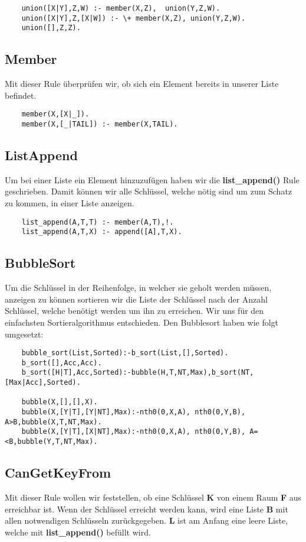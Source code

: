 \begin{verbatim}
    union([X|Y],Z,W) :- member(X,Z),  union(Y,Z,W).
    union([X|Y],Z,[X|W]) :- \+ member(X,Z), union(Y,Z,W).
    union([],Z,Z).
\end{verbatim}

\subsection{Member}
Mit dieser Rule überprüfen wir, ob sich ein Element bereits in 
unserer Liste befindet.

\begin{verbatim}
    member(X,[X|_]).
    member(X,[_|TAIL]) :- member(X,TAIL).
\end{verbatim}

\newpage

\subsection{ListAppend}
Um bei einer Liste ein Element hinzuzufügen haben wir die \textbf{list_append()} Rule geschrieben. Damit können wir alle Schlüssel, welche nötig sind um zum
Schatz zu kommen, in einer Liste anzeigen.

\begin{verbatim}
    list_append(A,T,T) :- member(A,T),!.
    list_append(A,T,X) :- append([A],T,X).
\end{verbatim}

\subsection{BubbleSort}
Um die Schlüssel in der Reihenfolge, in welcher sie geholt werden müssen, anzeigen zu können sortieren wir
die Liste der Schlüssel nach der Anzahl Schlüssel, welche benötigt werden um ihn zu erreichen.
Wir uns für den einfachsten Sortieralgorithmus 
entschieden. Den Bubblesort haben wie folgt umgesetzt:

\begin{verbatim}
    bubble_sort(List,Sorted):-b_sort(List,[],Sorted).
    b_sort([],Acc,Acc).
    b_sort([H|T],Acc,Sorted):-bubble(H,T,NT,Max),b_sort(NT,[Max|Acc],Sorted).
    
    bubble(X,[],[],X).
    bubble(X,[Y|T],[Y|NT],Max):-nth0(0,X,A), nth0(0,Y,B), A>B,bubble(X,T,NT,Max).
    bubble(X,[Y|T],[X|NT],Max):-nth0(0,X,A), nth0(0,Y,B), A=<B,bubble(Y,T,NT,Max).
\end{verbatim}

\subsection{CanGetKeyFrom}
Mit dieser Rule wollen wir feststellen, ob eine Schlüssel \textbf{K} von einem 
Raum \textbf{F} aus erreichbar ist. Wenn der Schlüssel erreicht werden kann, wird eine Liste \textbf{B}
mit allen notwendigen Schlüsseln zurückgegeben. \textbf{L} ist am Anfang eine leere Liste, welche mit 
\textbf{list_append()} befüllt wird.

